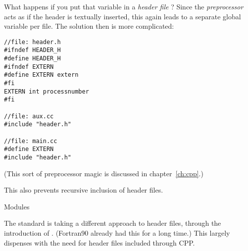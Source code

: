 What happens if you put that variable in a
%
\emph{header file}%
%
? Since the
%
\emph{preprocessor}%
acts as if the header is textually inserted, this again leads to
a separate global variable per file. The solution then is more
complicated:
\begin{lstlisting}
//file: header.h
#ifndef HEADER_H
#define HEADER_H
#ifndef EXTERN
#define EXTERN extern
#fi
EXTERN int processnumber
#fi

//file: aux.cc
#include "header.h"

//file: main.cc
#define EXTERN
#include "header.h"
\end{lstlisting}
(This sort of preprocessor magic is discussed in chapter~\ref{ch:cpp}.)

This also prevents recursive inclusion of header files.

 {Modules}

The  standard is taking a different approach
to header files, through the introduction of .
(Fortran90 already had this for a long time.)
This largely dispenses with the need for
header files included through \ac{CPP}.
